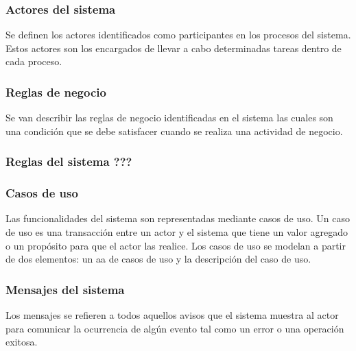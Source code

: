 \subsubsection{Actores del sistema}
 Se definen los actores identificados como participantes en los procesos del sistema. 
 Estos actores son los encargados de llevar a cabo determinadas tareas dentro de cada proceso.\\

 \subsubsection{Reglas de negocio}

 Se van describir las reglas de negocio identificadas en el sistema las cuales son una condición que 
 se debe satisfacer cuando se realiza una actividad de negocio.\\
 \subsubsection{Reglas del sistema ???}
 
\subsubsection{Casos de uso}

Las funcionalidades del sistema son representadas mediante casos de uso. Un caso de uso es una transacción entre un actor y el sistema que tiene un valor agregado o un propósito para que el actor las realice. Los casos de uso se modelan a partir de dos elementos: un aa de casos de uso y la
descripción del caso de uso.\\



\subsubsection{Mensajes del sistema}

Los mensajes se refieren a todos aquellos avisos que el sistema muestra al actor para comunicar la ocurrencia de algún evento tal como un error o una operación exitosa. 

